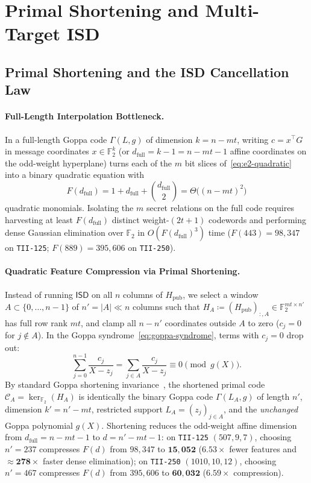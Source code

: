 \documentclass[11pt,a4paper]{article}
\theoremstyle{definition}
\theoremstyle{remark}
\newcommand{\F}{\mathbb{F}}
\newcommand{\ISD}{\mathsf{ISD}}
\begin{document}
\section{Primal Shortening and Multi-Target ISD}
\label{sec:isd-shortening}

\subsection{Primal Shortening and the ISD Cancellation Law}
\label{subsec:shortening-cancellation}

\paragraph{Full-Length Interpolation Bottleneck.}
In a full-length Goppa code $\Gamma(L, g)$ of dimension $k = n - mt$, writing $c = x^\top G$ in message coordinates $x \in \F_2^k$ (or $d_{\text{full}} = k - 1 = n - mt - 1$ affine coordinates on the odd-weight hyperplane) turns each of the $m$ bit slices of~\eqref{eq:e2-quadratic} into a binary quadratic equation with
\begin{equation}
\label{eq:f-d}
    F(d_{\text{full}}) = 1 + d_{\text{full}} + \binom{d_{\text{full}}}{2} = \Theta\!\big((n - mt)^2\big)
\end{equation}
quadratic monomials. Isolating the $m$ secret relations on the full code requires harvesting at least $F(d_{\text{full}})$ distinct weight-$(2t+1)$ codewords and performing dense Gaussian elimination over $\F_2$ in $O(F(d_{\text{full}})^3)$ time ($F(443) = 98{,}347$ on \texttt{TII-125}; $F(889) = 395{,}606$ on \texttt{TII-250}).

\paragraph{Quadratic Feature Compression via Primal Shortening.}
Instead of running $\ISD$ on all $n$ columns of $H_{\text{pub}}$, we select a window $A \subset \{0, \dots, n-1\}$ of $n' = |A| \ll n$ columns such that $H_A \coloneqq (H_{\text{pub}})_{:, A} \in \F_2^{mt \times n'}$ has full row rank $mt$, and clamp all $n - n'$ coordinates outside $A$ to zero ($c_j = 0$ for $j \notin A$). In the Goppa syndrome~\eqref{eq:goppa-syndrome}, terms with $c_j = 0$ drop out:
\[
    \sum_{j=0}^{n-1} \frac{c_j}{X - z_j}
    = \sum_{j \in A} \frac{c_j}{X - z_j} \equiv 0 \pmod{g(X)}.
\]
By standard Goppa shortening invariance~\cite{MS77,KM23}, the shortened primal code $\mathcal{C}_A = \ker_{\F_2}(H_A)$ is identically the binary Goppa code $\Gamma(L_A, g)$ of length $n'$, dimension $k' = n' - mt$, restricted support $L_A = (z_j)_{j \in A}$, and the \emph{unchanged} Goppa polynomial $g(X)$. Shortening reduces the odd-weight affine dimension from $d_{\text{full}} = n - mt - 1$ to $d = n' - mt - 1$: on \texttt{TII-125} $(507, 9, 7)$, choosing $n' = 237$ compresses $F(d)$ from $98{,}347$ to $\mathbf{15{,}052}$ ($6.53\times$ fewer features and $\approx \mathbf{278\times}$ faster dense elimination); on \texttt{TII-250} $(1010, 10, 12)$, choosing $n' = 467$ compresses $F(d)$ from $395{,}606$ to $\mathbf{60{,}032}$ ($6.59\times$ compression).
\end{document}
